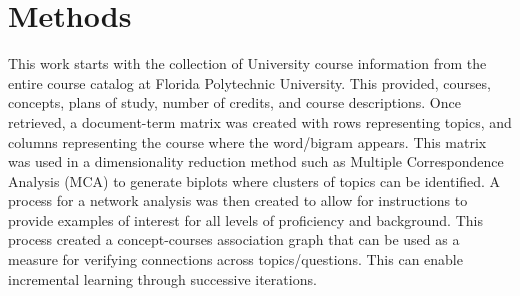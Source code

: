 \chapter{Methods}


This work starts with the collection of University course information from the entire course catalog at Florida Polytechnic University.  
This provided, courses, concepts, plans of study, number of credits, and course descriptions. Once retrieved, a document-term matrix was created with rows 
representing topics, and columns representing the course where the word/bigram appears. This matrix was used in a dimensionality reduction method such as Multiple 
Correspondence Analysis (MCA) to generate biplots where clusters of topics can be identified. A process for a network analysis was then created to allow for instructions 
to provide examples of interest for all levels of proficiency and background. This process created a concept-courses association graph that can be used as a measure for 
verifying connections across topics/questions. This can enable incremental learning through successive iterations. 
